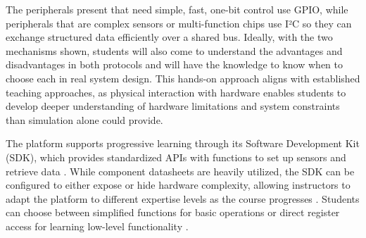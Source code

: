 \begin{table}[H]
    \caption{Peripherals on the TKJHAT connected via $\text{I}^2\text{C}$ buses and GPIO pins.}
    \end{table}

The peripherals present that need simple, fast, one-bit control use GPIO, while peripherals that are complex sensors or multi-function chips use I²C so they can exchange structured data efficiently over a shared bus. Ideally, with the two mechanisms shown, students will also come to understand the advantages and disadvantages in both protocols and will have the knowledge to know when to choose each in real system design. This hands-on approach aligns with established teaching approaches, as physical interaction with hardware enables students to develop deeper understanding of hardware limitations and system constraints than simulation alone could provide.

The platform supports progressive learning through its Software Development Kit (SDK), which provides standardized APIs with functions to set up sensors and retrieve data \cite{kelhala:2024}. While component datasheets are heavily utilized, the SDK can be configured to either expose or hide hardware complexity, allowing instructors to adapt the platform to different expertise levels as the course progresses \cite{kelhala:2024}. Students can choose between simplified functions for basic operations or direct register access for learning low-level functionality \cite{kelhala:2024}.
